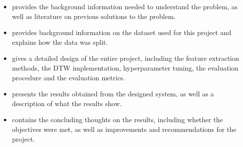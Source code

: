 \begin{itemize}
    \item {} provides the background information needed to understand the problem, as well 
    as literature on previous solutions to the problem.
    \item {} provides background information on the dataset used for this project and explains 
    how the data was split.
    \item {} gives a detailed design of the entire project, including the feature extraction 
    methods, the \acs{DTW} implementation, hyperparameter tuning, the evaluation procedure and the evaluation metrics.
    \item {} presents the results obtained from the designed system, as well as a description 
    of what the results show.
    \item {} contains the concluding thoughts on the results, including whether the objectives were met, 
    as well as improvements and recommendations for the project.
\end{itemize}
